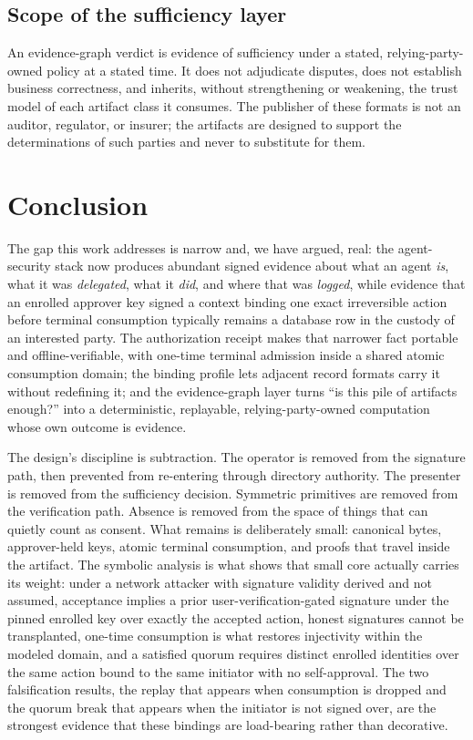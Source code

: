 \documentclass[11pt]{article}
\begin{document}
\subsection{Scope of the sufficiency layer}

An evidence-graph verdict is evidence of sufficiency under a stated,
relying-party-owned policy at a stated time. It does not adjudicate disputes, does
not establish business correctness, and inherits, without strengthening or
weakening, the trust model of each artifact class it consumes. The publisher of
these formats is not an auditor, regulator, or insurer; the artifacts are designed
to support the determinations of such parties and never to substitute for them.

\section{Conclusion}

The gap this work addresses is narrow and, we have argued, real: the agent-security
stack now produces abundant signed evidence about what an agent \emph{is}, what it
was \emph{delegated}, what it \emph{did}, and where that was \emph{logged}, while
evidence that an enrolled approver key signed a context binding one exact
irreversible action before terminal consumption typically remains a database row
in the custody of an interested party. The authorization receipt makes that
narrower fact portable and offline-verifiable, with one-time terminal admission
inside a shared atomic consumption domain; the binding profile lets adjacent record
formats carry it without redefining it; and the evidence-graph layer turns ``is
this pile of artifacts enough?'' into a deterministic, replayable,
relying-party-owned computation whose own outcome is evidence.

The design's discipline is subtraction. The operator is removed from the signature
path, then prevented from re-entering through directory authority. The presenter is
removed from the sufficiency decision. Symmetric primitives are removed from the
verification path. Absence is removed from the space of things that can quietly
count as consent. What remains is deliberately small: canonical bytes, approver-held
keys, atomic terminal consumption, and proofs that travel inside the artifact. The
symbolic analysis is what shows that small core actually carries its weight: under
a network attacker with signature validity derived and not assumed, acceptance
implies a prior user-verification-gated signature under the pinned enrolled key
over exactly the accepted action, honest signatures cannot be transplanted,
one-time consumption is what restores injectivity within the modeled domain, and a
satisfied quorum requires distinct enrolled identities over the same action bound
to the same initiator with no self-approval. The two falsification results, the
replay that appears when consumption is dropped and the quorum break that appears
when the initiator is not signed over, are the strongest evidence that these
bindings are load-bearing rather than decorative.
\end{document}
